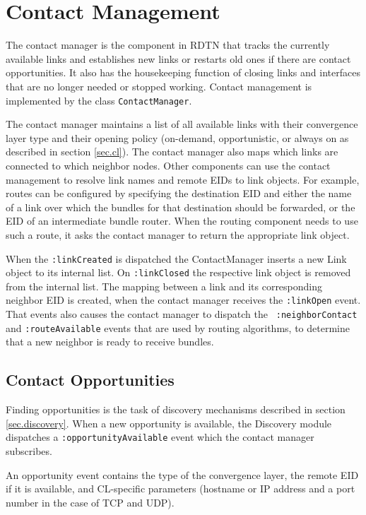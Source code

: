 \documentclass{article}
\begin{document}
\section{Contact Management}\label{sec.contact-mngt}

The contact manager is the component in RDTN that tracks the currently available
links and establishes new links or restarts old ones if there are contact
opportunities. It also has the housekeeping function of closing links and
interfaces that are no longer needed or stopped working. Contact management is
implemented by the class {\tt ContactManager}.

The contact manager maintains a list of all available links with their
convergence layer type and their opening policy (on-demand, opportunistic, or
always on as described in section \ref{sec.cl}). The contact manager also maps
which links are connected to which neighbor nodes. Other components can use the
contact management to resolve link names and remote EIDs to link objects. For
example, routes can be configured by specifying the destination EID and either
the name of a link over which the bundles for that destination should be
forwarded, or the EID of an intermediate bundle router. When the routing
component needs to use such a route, it asks the contact manager to return the
appropriate link object.

When the {\tt :linkCreated} is dispatched the ContactManager inserts a new Link
object to its internal list.  On {\tt :linkClosed} the respective link object is
removed from the internal list. The mapping between a link and its corresponding
neighbor EID is created, when the contact manager receives the {\tt :linkOpen}
event. That events also causes the contact manager to dispatch the {\tt
:neighborContact} and {\tt :routeAvailable} events that are used by routing
algorithms, to determine that a new neighbor is ready to receive bundles.

\subsection{Contact Opportunities}

Finding opportunities is the task of discovery mechanisms described in section
\ref{sec.discovery}.  When a new opportunity is available, the Discovery module
dispatches a {\tt :opportunityAvailable} event which the contact manager
subscribes.

An opportunity event contains the type of the convergence layer, the remote EID
if it is available, and CL-specific parameters (hostname or IP address and a
port number in the case of TCP and UDP).
\end{document}
